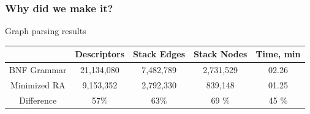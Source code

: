 \documentclass{beamer}
\begin{document}
	\begin{frame} 
		\frametitle{Why did we make it?} 
		\begin{center}
		Graph parsing results
		\begin{tabular}{ | c | c | c | c | c | }
			\hline
			             &  Descriptors & Stack Edges & Stack Nodes & Time, min   \\ \hline
			BNF Grammar  &  21,134,080       & 7,482,789      & 2,731,529      & 02.26  \\ \hline
			Minimized RA &  9,153,352        &  2,792,330     & 839,148        & 01.25  \\ \hline \hline
			Difference   &  57$\%$       & 63$\%$     & 69 $\%$    &  45 $\%$ \\ \hline
		\end{tabular}
		\end{center}

	\end{frame} 
	
\end{document}
